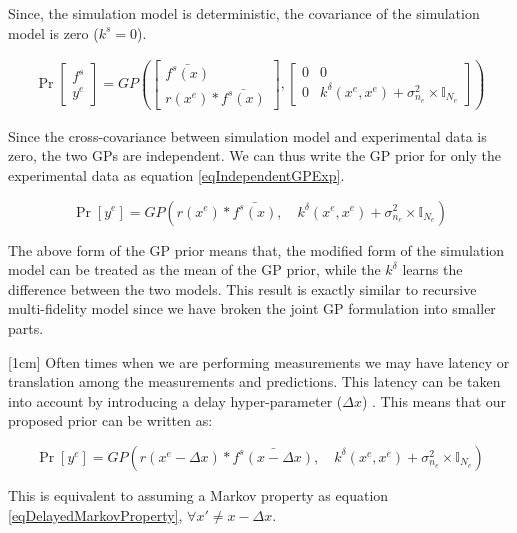 \begin{mdframed}[hidealllines=true,backgroundcolor=blue!20]
Since, the simulation model is deterministic, the covariance of the simulation model is zero ($k^s = 0$).

\begin{align}
\Pr \begin{bmatrix}
f^{s}\\ 
y^{e}
\end{bmatrix}    = GP \left ( \begin{bmatrix}
\bar{f^{s}(x)}\\ 
r(x^{e})*\bar{f^{s}(x)}
\end{bmatrix}, \begin{bmatrix} 0 & 0   \\
           0 & k^{\delta}(x^{e}, x^{e}) + \sigma_{n_{e}}^2 \times \mathbb{I}_{N_{e}}\end{bmatrix} \right ) 
\end{align}

Since the cross-covariance between simulation model and experimental data is zero, the two GPs are independent. We can thus write the GP prior for only the experimental data as equation \ref{eqIndependentGPExp}.

\begin{equation}\label{eqIndependentGPExp}
\Pr[y^{e}] = GP \left( r(x^{e})*\bar{f^{s}(x)}, \quad k^{\delta}(x^{e}, x^{e}) + \sigma_{n_{e}}^2 \times \mathbb{I}_{N_{e}} \right)
\end{equation}

The above form of the GP prior means that, the modified form of the simulation model can be treated as the mean of the GP prior, while the $k^{\delta}$ learns the difference between the two models. This result is exactly similar to recursive multi-fidelity model \cite{gratiet2012recursive} since we have broken the joint GP formulation into smaller parts. 

[1cm]
Often times when we are performing measurements we may have latency or translation among the measurements and predictions. This latency can be taken into account by introducing a delay hyper-parameter ($\Delta x$) \cite{osborne2008towards}. This means that our proposed prior can be written as:

\begin{equation}\label{eqProposedGPExp}
\Pr[y^{e}] = GP \left( r(x^{e} -\Delta x )*\bar{f^{s}(x - \Delta x)}, \quad k^{\delta}(x^{e}, x^{e}) + \sigma_{n_{e}}^2 \times \mathbb{I}_{N_{e}} \right)
\end{equation}

This is equivalent to assuming a Markov property as equation \ref{eqDelayedMarkovProperty}, $\forall x' \neq x - \Delta x$.


\end{mdframed}
